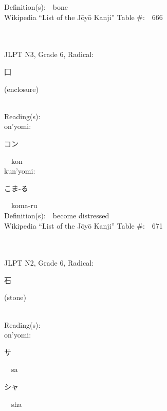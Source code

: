 \begin{multicols}{2}
Definition(s):\ \ bone \\
Wikipedia ``List of the J\=oy\=o Kanji'' Table \#:\ \ 666 \\
\ \ \\
{\fontsize{34pt}{40pt}  }\ \ \\  %
{JLPT N3, Grade 6, Radical:\ \ {\begin{CJK}{UTF8}{min} 囗 \end{CJK}} (enclosure) } \\
Reading(s):\ \ \\
{\hspace*{1em}}on'yomi:\ \ \\
{\hspace*{2em}}{\begin{CJK}{UTF8}{min} コン \end{CJK}}\ \ kon\ \ \\
{\hspace*{1em}}kun'yomi:\ \ \\
{\hspace*{2em}}{\begin{CJK}{UTF8}{min} こま-る \end{CJK}}\ \ koma-ru\ \ \\
Definition(s):\ \ become distressed \\
Wikipedia ``List of the J\=oy\=o Kanji'' Table \#:\ \ 671 \\
\ \ \\
{\fontsize{34pt}{40pt}  }\ \ \\  %
{JLPT N2, Grade 6, Radical:\ \ {\begin{CJK}{UTF8}{min} 石 \end{CJK}} (stone) } \\
Reading(s):\ \ \\
{\hspace*{1em}}on'yomi:\ \ \\
{\hspace*{2em}}{\begin{CJK}{UTF8}{min} サ \end{CJK}}\ \ sa\ \ \\
{\hspace*{2em}}{\begin{CJK}{UTF8}{min} シャ \end{CJK}}\ \ sha\ \ \\

\end{multicols}
